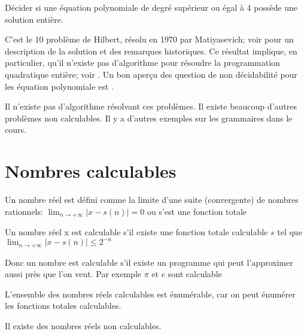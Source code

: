 \begin{mydef}
  Décider si une équation
  polynomiale de degré supérieur ou égal à 4 possède une solution entière.
\end{mydef}
C'est le 10\ieme{} problème de Hilbert, résolu en 1970 par Matiyasevich;
voir \cite{davis1973hilbert} pour un description de la solution et des remarques historiques.
Ce résultat implique, en particulier, qu'il n'existe pas d'algorithme pour résoudre
la programmation quadratique entière; voir \cite{jeroslow1973there}.
Un bon aperçu des question de non décidabilité pour les équation polynomiale est \cite{koenigsmann2014undecidability}.

Il n'existe pas d'algorithme résolvant ces problèmes. Il existe beaucoup
d'autres problèmes non calculables. Il y a d'autres exemples sur les grammaires dans le cours.

\section{Nombres calculables}
\label{sub:nombres_calculables}

\begin{mydef}
	Un nombre réel est défini comme la limite d'une suite (convergente) de
	nombres rationnels: $\lim_{n \rightarrow +\infty} |x-s(n)| = 0 $ ou s’est
	une fonction totale
\end{mydef}

\begin{mydef}
	Un nombre réel x est calculable s’il existe une fonction totale
	calculable $s$ tel que $\lim_{n \rightarrow +\infty} |x-s(n)| \leq 2^{-n}$
\end{mydef}

\begin{myrem}
	Donc un nombre est calculable s'il existe un programme qui peut
	l'approximer aussi près que l'on veut. Par exemple $\pi$ et $e$ sont
	calculable
\end{myrem}

\begin{myprop}
	L'ensemble des nombres réels calculables est énumérable, car on peut énumérer les
	fonctions totales calculables.
\end{myprop}

\begin{myprop}
	Il existe des nombres réels non calculables.
\end{myprop}

